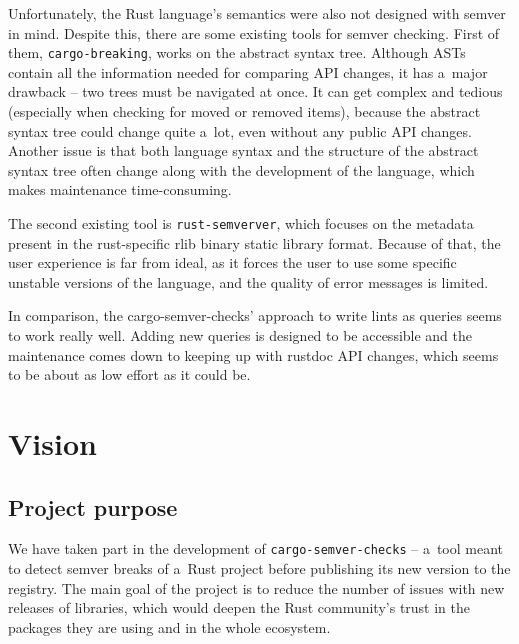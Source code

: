 \documentclass[licencjacka,en]{pracamgr}
\begin{document}
Unfortunately, the Rust language's semantics were also not designed with semver in mind.
Despite this, there are some existing tools for semver checking. First of them,
\texttt{cargo-breaking}, works on the abstract syntax tree. Although ASTs contain all the
information needed for comparing API changes, it has a~major drawback -- two trees must be
navigated at once. It can get complex and tedious (especially when checking for moved or removed
items), because the abstract syntax tree could change quite a~lot, even without any public API
changes. Another issue is that both language syntax and the structure of the abstract syntax tree
often change along with the development of the language, which makes maintenance time-consuming.

The second existing tool is \texttt{rust-semverver}, which focuses on the metadata present in the
rust-specific rlib binary static library format. Because of that, the user experience is far from
ideal, as it forces the user to use some specific unstable versions of the language, and the
quality of error messages is limited.

In comparison, the cargo-semver-checks' approach to write lints as queries seems to work
really well. Adding new queries is designed to be accessible and the maintenance comes down to
keeping up with rustdoc API changes, which seems to be about as low effort as it could be.


\chapter{Vision}\label{r:chapter_vision}

\section{Project purpose}\label{r:section_project_purpose}

We have taken part in the development of \texttt{cargo-semver-checks} -- a~tool meant to detect
semver breaks of a~Rust project before publishing its new version to the registry. The main goal
of the project is to reduce the number of issues with new releases of libraries, which would deepen
the Rust community's trust in the packages they are using and in the whole ecosystem.
\end{document}
